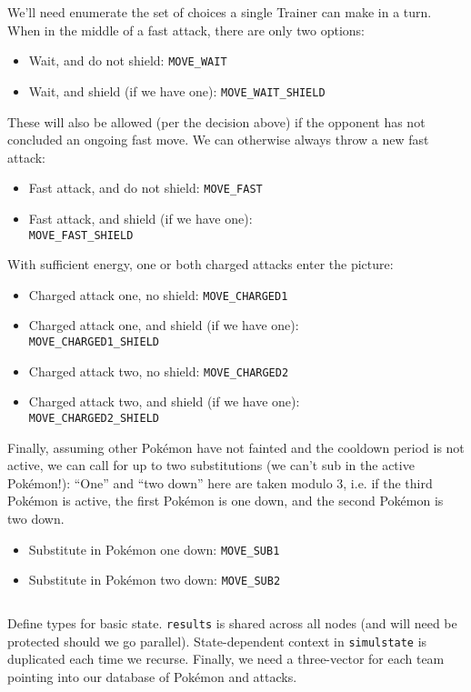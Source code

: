 We'll need enumerate the set of choices a single Trainer can make in a turn.
When in the middle of a fast attack, there are only two options:
\begin{itemize}
\item Wait, and do not shield: \texttt{MOVE\_WAIT}
\item Wait, and shield (if we have one): \texttt{MOVE\_WAIT\_SHIELD}
\end{itemize}
These will also be allowed (per the decision above) if the opponent has not concluded an ongoing fast move.
We can otherwise always throw a new fast attack:
\begin{itemize}
\item Fast attack, and do not shield: \texttt{MOVE\_FAST}
\item Fast attack, and shield (if we have one):\\
  \texttt{MOVE\_FAST\_SHIELD}
\end{itemize}
With sufficient energy, one or both charged attacks enter the picture:
\begin{itemize}
\item Charged attack one, no shield: \texttt{MOVE\_CHARGED1}
\item Charged attack one, and shield (if we have one):\\
  \texttt{MOVE\_CHARGED1\_SHIELD}
\item Charged attack two, no shield: \texttt{MOVE\_CHARGED2}
\item Charged attack two, and shield (if we have one):\\
  \texttt{MOVE\_CHARGED2\_SHIELD}
\end{itemize}
Finally, assuming other Pokémon have not fainted and the cooldown period is not active,
 we can call for up to two substitutions (we can't sub in the active Pokémon!):
``One'' and ``two down'' here are taken modulo 3,
 i.e. if the third Pokémon is active, the first Pokémon is one down,
 and the second Pokémon is two down.
\begin{itemize}
\item Substitute in Pokémon one down: \texttt{MOVE\_SUB1}
\item Substitute in Pokémon two down: \texttt{MOVE\_SUB2}
\end{itemize}
\inputminted{cpp}{s/moves.h}
Define types for basic state.
\texttt{results} is shared across all nodes (and will need be protected should we go parallel).
State-dependent context in \texttt{simulstate} is duplicated each time we recurse.
Finally, we need a three-vector for each team pointing into our database of Pokémon and attacks.
